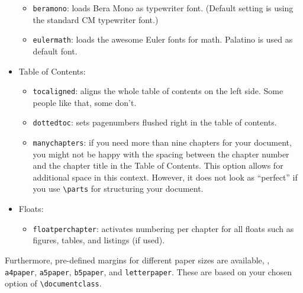 \begin{itemize}
\begin{itemize}
            \item\texttt{beramono}: loads Bera Mono as typewriter font.
            (Default setting is using the standard CM typewriter font.)

            \item\texttt{eulermath}: loads the awesome Euler fonts for math.
            Pala\-tino is used as default font.
        \end{itemize}


    \item Table of Contents:
        \begin{itemize}
            \item\texttt{tocaligned}: aligns the whole table of contents on
            the left side. Some people like that, some don't.

            \item\texttt{dottedtoc}: sets pagenumbers flushed right in the
            table of contents.

            \item\texttt{manychapters}: if you need more than nine chapters for
            your document, you might not be happy with the spacing between the
            chapter number and the chapter title in the Table of Contents.
            This option allows for additional space in this context.
            However, it does not look as ``perfect'' if you use
            \verb|\parts| for structuring your document.
        \end{itemize}

    \item Floats:
        \begin{itemize}

            \item\texttt{floatperchapter}: activates numbering per chapter for
            all floats such as figures, tables, and listings (if used).
        \end{itemize}

\end{itemize}

Furthermore, pre-defined margins for different paper sizes are available, \eg, \texttt{a4paper}, \texttt{a5paper}, \texttt{b5paper}, and \texttt{letterpaper}. These are based on your chosen option of \verb|\documentclass|.

